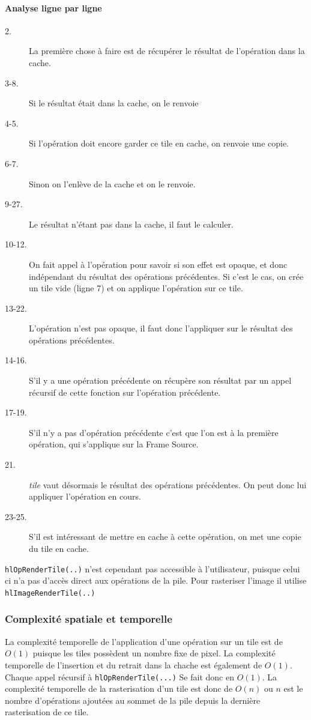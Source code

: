 		\paragraph{Analyse ligne par ligne}
		\begin{description}
			\item[2.] La première chose à faire est de récupérer le résultat de l'opération dans la cache. 
			\item[3-8.] Si le résultat était dans la cache, on le renvoie
			\item[4-5.] Si l'opération doit encore garder ce tile en cache, on renvoie une copie.
			\item[6-7.] Sinon on l'enlève de la cache et on le renvoie.
			\item[9-27.] Le résultat n'étant pas dans la cache, il faut le calculer.
			\item[10-12.] On fait appel à l'opération pour savoir si son effet est opaque, et donc indépendant du résultat des opérations
			 précédentes. Si c'est le cas, on crée un tile vide (ligne 7) et on applique l'opération sur ce tile.
			\item[13-22.] L'opération n'est pas opaque, il faut donc l'appliquer sur le résultat des opérations précédentes.
			\item[14-16.] S'il y a une opération précédente on récupère son résultat par un appel récursif de cette fonction sur l'opération
			précédente.
			\item[17-19.] S'il n'y a pas d'opération précédente c'est que l'on est à la première opération, qui s'applique sur la Frame Source.
			\item[21.] \emph{tile} vaut désormais le résultat des opérations précédentes. On peut donc lui appliquer l'opération en cours.
			\item[23-25.] S'il est intéressant de mettre en cache à cette opération, on met une copie du tile en cache.
		\end{description}

		\lstinline$hlOpRenderTile(..)$ n'est cependant pas accessible à l'utilisateur, puisque celui ci n'a pas d'accès direct aux opérations de la pile.
		Pour rasteriser l'image il utilise \lstinline$hlImageRenderTile(..)$ 
		
		\subsubsection{Complexité spatiale et temporelle}
		La complexité temporelle de l'application d'une opération sur un tile est de $O(1)$ puisque les tiles possèdent un nombre fixe de pixel. 
		La complexité temporelle de l'insertion et du retrait dans la chache est également de $O(1)$. Chaque appel récursif à \lstinline$hlOpRenderTile(...)$
		Se fait donc en $O(1)$. La complexité temporelle de la rasterisation d'un tile est donc de $O(n)$ ou $n$ est le nombre 
		d'opérations ajoutées au sommet de la pile depuis la dernière rasterisation de ce tile. 

